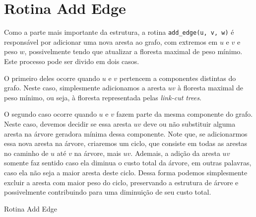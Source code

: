 \section{Rotina Add Edge}
\label{sec:imsf-add-edge}

Como a parte mais importante da estrutura, a rotina \texttt{add\_edge(u, v, w)} é responsável por adicionar uma nova aresta ao grafo, com extremos em $u$ e $v$ e peso $w$, possivelmente tendo que atualizar a floresta maximal de peso mínimo. Este processo pode ser divido em dois casos.

O primeiro deles ocorre quando $u$ e $v$ pertencem a componentes distintas do grafo. Neste caso, simplesmente adicionamos a aresta $uv$ à floresta maximal de peso mínimo, ou seja, à floresta representada pelas \emph{link-cut trees}.

O segundo caso ocorre quando $u$ e $v$ fazem parte da mesma componente do grafo. Neste caso, devemos decidir se essa aresta $uv$ deve ou não substituir alguma aresta na árvore geradora mínima dessa componente. Note que, se adicionarmos essa nova aresta na árvore, criaremos um ciclo, que consiste em todas as arestas no caminho de $u$ até $v$ na árvore, mais $uv$. Ademais, a adição da aresta $uv$ somente faz sentido caso ela diminua o custo total da árvore, em outras palavras, caso ela não seja a maior aresta deste ciclo. Dessa forma podemos simplesmente excluir a aresta com maior peso do ciclo, preservando a estrutura de árvore e possivelmente contribuindo para uma diminuição de seu custo total.

\begin{algorithm}[h!]
    \caption{Rotina Add Edge}\label{imsf-add-edge}
    \begin{algorithmic}[1]
        \EndIf
        \EndFunction
    \end{algorithmic}
\end{algorithm}

